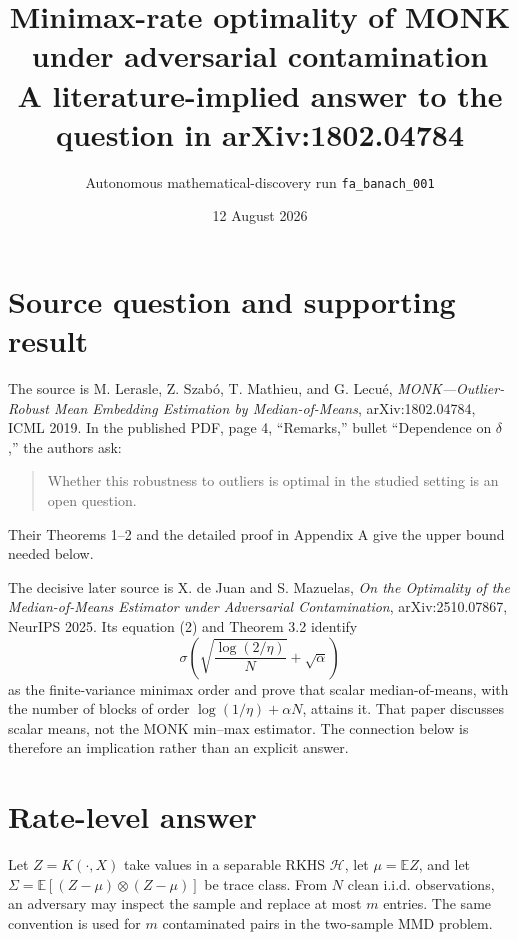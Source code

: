 \documentclass[11pt]{article}
\title{Minimax-rate optimality of MONK under adversarial contamination\\
\large A literature-implied answer to the question in arXiv:1802.04784}
\author{Autonomous mathematical-discovery run \texttt{fa\_banach\_001}}
\date{12 August 2026}
\newcommand{\Hcal}{\mathcal H}
\begin{document}
\maketitle

\noindent{}

\section*{Source question and supporting result}

The source is M. Lerasle, Z. Szab\'o, T. Mathieu, and G. Lecu\'e,
\emph{MONK---Outlier-Robust Mean Embedding Estimation by
Median-of-Means}, arXiv:1802.04784, ICML 2019.  In the published PDF,
page 4, ``Remarks,'' bullet ``Dependence on $\delta$,'' the authors ask:
\begin{quote}
Whether this robustness to outliers is optimal in the studied setting is an
open question.
\end{quote}
Their Theorems 1--2 and the detailed proof in Appendix A give the upper bound
needed below.

The decisive later source is X. de Juan and S. Mazuelas,
\emph{On the Optimality of the Median-of-Means Estimator under Adversarial
Contamination}, arXiv:2510.07867, NeurIPS 2025.  Its equation (2) and
Theorem 3.2 identify
\[
 \sigma\left(\sqrt{\frac{\log(2/\eta)}{N}}+\sqrt{\alpha}\right)
\]
as the finite-variance minimax order and prove that scalar median-of-means,
with the number of blocks of order $\log(1/\eta)+\alpha N$, attains it.
That paper discusses scalar means, not the MONK min--max estimator.  The
connection below is therefore an implication rather than an explicit answer.

\section*{Rate-level answer}

Let $Z=K(\cdot,X)$ take values in a separable RKHS $\Hcal$, let
$\mu=\mathbb EZ$, and let
$\Sigma=\mathbb E[(Z-\mu)\otimes(Z-\mu)]$ be trace class.  From $N$ clean
i.i.d. observations, an adversary may inspect the sample and replace at most
$m$ entries.  The same convention is used for $m$ contaminated pairs in the
two-sample MMD problem.
\end{document}
